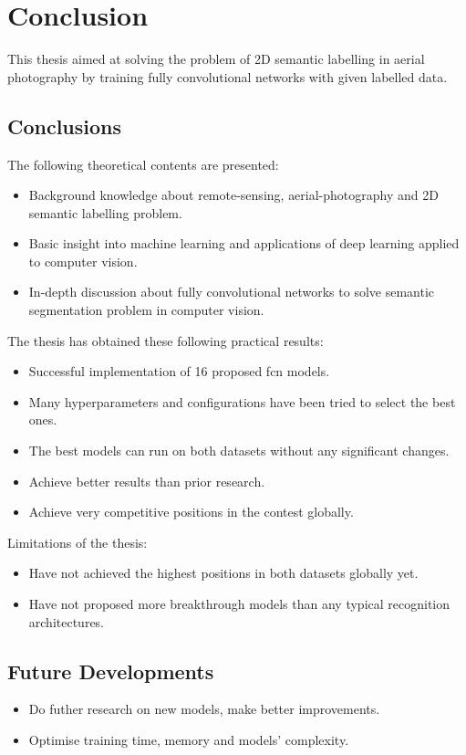 \chapter*{Conclusion}
This thesis aimed at solving the problem of 2D semantic labelling in aerial
photography by training fully convolutional networks with given labelled data.

\section*{Conclusions}
The following theoretical contents are presented:
\begin{itemize}
    \item Background knowledge about \gls{remote-sensing},
    \gls{aerial-photography} and 2D semantic labelling problem.
    \item Basic insight into machine learning and applications of deep learning
    applied to computer vision.
    \item In-depth discussion about fully convolutional networks to solve
    semantic segmentation problem in computer vision.
\end{itemize}

The thesis has obtained these following practical results:
\begin{itemize}
    \item Successful implementation of 16 proposed \acrshort{fcn} models.
    \item Many hyperparameters and configurations have been tried to select the
    best ones.
    \item The best models can run on both datasets without any significant
    changes.
    \item Achieve better results than prior research.
    \item Achieve very competitive positions in the contest globally.
\end{itemize}

Limitations of the thesis:
\begin{itemize}
    \item Have not achieved the highest positions in both datasets globally yet.
    \item Have not proposed more breakthrough models than any typical
    recognition architectures.
\end{itemize}

\section*{Future Developments}
\begin{itemize}
    \item Do futher research on new models, make better improvements.
    \item Optimise training time, memory and models' complexity.
\end{itemize}
